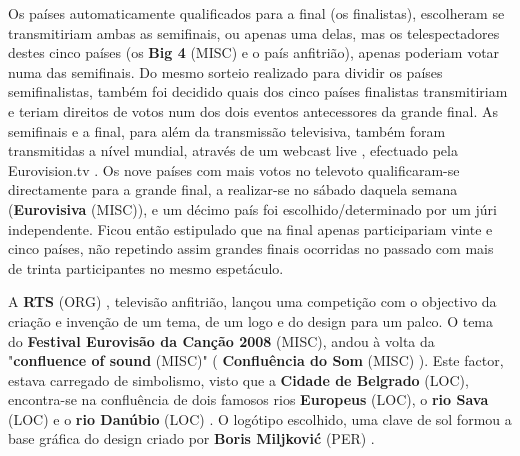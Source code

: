 \documentclass[12pt,a4paper]{article}
\begin{document}
Os países automaticamente qualificados para a final (os finalistas), escolheram se transmitiriam ambas as semifinais, ou apenas uma delas, mas os telespectadores destes cinco países (os \textbf{Big 4} (MISC) e o país anfitrião), apenas poderiam votar numa das semifinais. Do mesmo sorteio realizado para dividir os países semifinalistas, também foi decidido quais dos cinco países finalistas transmitiriam e teriam direitos de votos num dos dois eventos antecessores da grande final. As semifinais e a final, para além da transmissão televisiva, também foram transmitidas a nível mundial, através de um webcast live , efectuado pela Eurovision.tv . Os nove países com mais votos no televoto qualificaram-se directamente para a grande final, a realizar-se no sábado daquela semana (\textbf{Eurovisiva} (MISC)), e um décimo país foi escolhido/determinado por um júri independente. Ficou então estipulado que na final apenas participariam vinte e cinco países, não repetindo assim grandes finais ocorridas no passado com mais de trinta participantes no mesmo espetáculo.

A \textbf{RTS} (ORG) , televisão anfitrião, lançou uma competição com o objectivo da criação e invenção de um tema, de um logo e do design para um palco. O tema do \textbf{Festival Eurovisão da Canção 2008} (MISC), andou à volta da "\textbf{confluence of sound} (MISC)" ( \textbf{Confluência do Som} (MISC) ). Este factor, estava carregado de simbolismo, visto que a \textbf{Cidade de Belgrado} (LOC), encontra-se na confluência de dois famosos rios \textbf{Europeus} (LOC), o \textbf{rio Sava} (LOC) e o \textbf{rio Danúbio} (LOC) . O logótipo escolhido, uma clave de sol formou a base gráfica do design criado por \textbf{Boris Miljković} (PER) .
\end{document}

